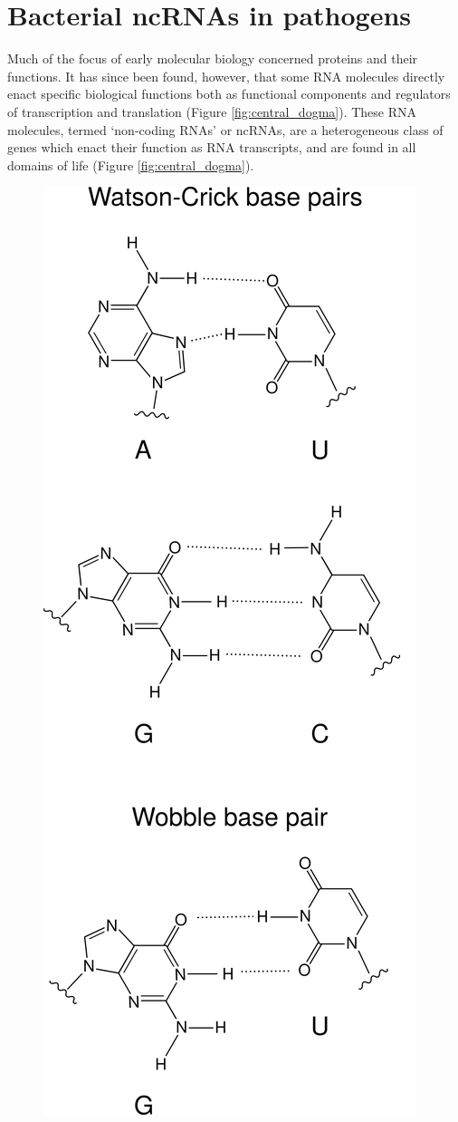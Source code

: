 \section{Bacterial ncRNAs in pathogens} 
Much of the focus of early molecular biology concerned proteins and their functions. It has since been found, however, that some RNA molecules directly enact specific biological functions both as functional components and regulators of transcription and translation \citep{Eddy2001-jv,Morris2014-mm} (Figure \ref{fig:central_dogma}). These RNA molecules, termed ‘non-coding RNAs’ or ncRNAs, are a heterogeneous class of genes which enact their function as RNA transcripts, and are found in all domains of life (Figure \ref{fig:central_dogma}). 
\begin{figure}[H]
    \centering
    \begin{minipage}[b]{0.47\linewidth}
  \includegraphics[scale=0.45]{intro/basepairing.png}

\end{minipage}
\end{figure}
